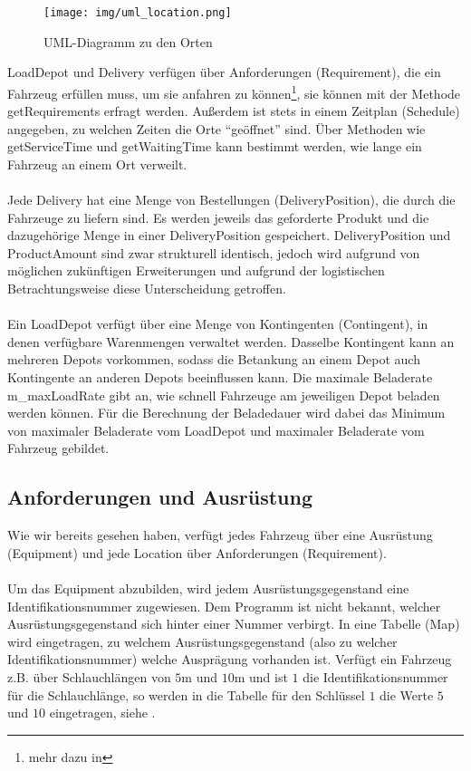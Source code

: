 \begin{figure}[h]
  \centering
  \texttt{[image: img/uml\_location.png]}
  \caption{UML-Diagramm zu den Orten}
  \label{fig:uml_location}
\end{figure}

\noindent
\textsf{LoadDepot} und \textsf{Delivery} verfügen über Anforderungen (\textsf{Requirement}), die ein Fahrzeug erfüllen muss, um sie anfahren zu können\footnote{mehr dazu in }, sie können mit der Methode \textsf{getRequirements} erfragt werden. Außerdem ist stets in einem Zeitplan (\textsf{Schedule}) angegeben, zu welchen Zeiten die Orte ``geöffnet'' sind. Über Methoden wie \textsf{getServiceTime} und \textsf{getWaitingTime} kann bestimmt werden, wie lange ein Fahrzeug an einem Ort verweilt. \\
\\
Jede \textsf{Delivery} hat eine Menge von Bestellungen (\textsf{DeliveryPosition}), die durch die Fahrzeuge zu liefern sind. Es werden jeweils das geforderte Produkt und die dazugehörige Menge in einer \textsf{DeliveryPosition} gespeichert. \textsf{DeliveryPosition} und \textsf{ProductAmount} sind zwar strukturell identisch, jedoch wird aufgrund von möglichen zukünftigen Erweiterungen und aufgrund der logistischen Betrachtungsweise diese Unterscheidung getroffen. \\
\\
Ein \textsf{LoadDepot} verfügt über eine Menge von Kontingenten (\textsf{Contingent}), in denen ver\-füg\-bare Warenmengen verwaltet werden. Dasselbe Kontingent kann an mehreren Depots vorkommen, sodass die Betankung an einem Depot auch Kontingente an anderen Depots beeinflussen kann. Die maximale Beladerate \textsf{m\_maxLoadRate} gibt an, wie schnell Fahrzeuge am jeweiligen Depot beladen werden können. Für die Berechnung der Beladedauer wird dabei das Minimum von maximaler Beladerate vom \textsf{LoadDepot} und maximaler Beladerate vom Fahrzeug gebildet.


\subsection{Anforderungen und Ausrüstung}\label{chp:equipment_requirement}
Wie wir bereits gesehen haben, verfügt jedes Fahrzeug über eine Ausrüstung (\textsf{Equipment}) und jede \textsf{Location} über Anforderungen (\textsf{Requirement}). \\
\\
Um das \textsf{Equipment} abzubilden, wird jedem Ausrüstungsgegenstand eine Identifikationsnummer zugewiesen. Dem Programm ist nicht bekannt, welcher Aus\-rüs\-tungs\-ge\-gen\-stand sich hinter einer Nummer verbirgt. In eine Tabelle (\textsf{Map}) wird eingetragen, zu welchem Aus\-rüs\-tungs\-ge\-gen\-stand (also zu welcher Identifikationsnummer) welche Ausprägung vorhanden ist. Verfügt ein Fahrzeug z.B. über Schlauchlängen von $5$m und $10$m und ist $1$ die Identifikationsnummer für die Schlauchlänge, so werden in die Tabelle für den Schlüssel $1$ die Werte $5$ und $10$ eingetragen, siehe .

